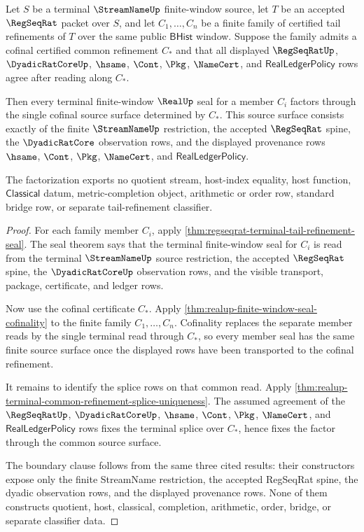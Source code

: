 \begin{theorem}
\label{thm:realup-terminal-tail-refinement-family-factorization}
Let $S$ be a terminal $\StreamNameUp$ finite-window source, let $T$ be an
accepted $\RegSeqRat$ packet over $S$, and let
$C_1,\ldots,C_n$ be a finite family of certified tail refinements of $T$ over
the same public $\mathsf{BHist}$ window. Suppose the family admits a cofinal
certified common refinement $C_\ast$ and that all displayed $\RegSeqRatUp$,
$\DyadicRatCoreUp$, $\hsame$, $\Cont$, $\Pkg$, $\NameCert$, and
$\mathsf{RealLedgerPolicy}$ rows agree after reading along $C_\ast$.

Then every terminal finite-window $\RealUp$ seal for a member $C_i$ factors
through the single cofinal source surface determined by $C_\ast$. This source
surface consists exactly of the finite $\StreamNameUp$ restriction, the
accepted $\RegSeqRat$ spine, the $\DyadicRatCore$ observation rows, and the
displayed provenance rows $\hsame$, $\Cont$, $\Pkg$, $\NameCert$, and
$\mathsf{RealLedgerPolicy}$.

The factorization exports no quotient stream, host-index equality, host
function, $\mathsf{Classical}$ datum, metric-completion object, arithmetic or
order row, standard bridge row, or separate tail-refinement classifier.
\end{theorem}
\begin{proof}
For each family member $C_i$, apply
\autoref{thm:regseqrat-terminal-tail-refinement-seal}. The seal theorem says
that the terminal finite-window seal for $C_i$ is read from the terminal
$\StreamNameUp$ source restriction, the accepted $\RegSeqRat$ spine, the
$\DyadicRatCoreUp$ observation rows, and the visible transport, package,
certificate, and ledger rows.

Now use the cofinal certificate $C_\ast$. Apply
\autoref{thm:realup-finite-window-seal-cofinality} to the finite family
$C_1,\ldots,C_n$. Cofinality replaces the separate member reads by the single
terminal read through $C_\ast$, so every member seal has the same finite
source surface once the displayed rows have been transported to the cofinal
refinement.

It remains to identify the splice rows on that common read. Apply
\autoref{thm:realup-terminal-common-refinement-splice-uniqueness}. The assumed
agreement of the $\RegSeqRatUp$, $\DyadicRatCoreUp$, $\hsame$, $\Cont$,
$\Pkg$, $\NameCert$, and $\mathsf{RealLedgerPolicy}$ rows fixes the terminal
splice over $C_\ast$, hence fixes the factor through the common source
surface.

The boundary clause follows from the same three cited results: their
constructors expose only the finite StreamName restriction, the accepted
RegSeqRat spine, the dyadic observation rows, and the displayed provenance
rows. None of them constructs quotient, host, classical, completion,
arithmetic, order, bridge, or separate classifier data.
\end{proof}

